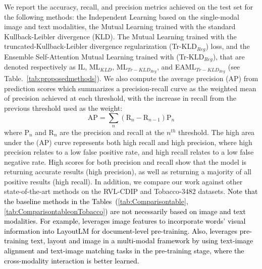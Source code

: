 \documentclass[twocolumn]{svjour3}
\begin{document}
We report the accuracy, recall, and precision metrics achieved on the test set for the following methods: the Independent Learning based on the single-modal image and text modalities, the Mutual Learning trained with the standard Kullback-Leibler divergence (KLD). The Mutual Learning trained with the truncated-Kullback-Leibler divergence regularization (Tr-KLD$_{Reg}$) loss, and the Ensemble Self-Attention Mutual Learning trained with (Tr-KLD$_{Reg}$), that are denoted respectively as IL, ML$_{KLD}$, ML$_{{Tr-KLD}_{Reg}}$, and EAML$_{{Tr-KLD}_{Reg}}$ (see Table.~\ref{tab:proposedmethods}). 
We also compute the average precision (AP) from prediction scores which summarizes a precision-recall curve as the weighted mean of precision achieved at each threshold, with the increase in recall from the previous threshold used as the weight:
\begin{equation}
    \mathrm{AP} = \sum_{n}(\mathrm{R}_{n} - \mathrm{R}_{n-1})\mathrm{P}_{n}
    \label{eq:equation22}
\end{equation}
where $\mathrm{P}_{n}$ and $\mathrm{R}_{n}$ are the precision and recall at the $n^{th}$ threshold. The high area under the (AP) curve represents both high recall and high precision, where high precision relates to a low false positive rate, and high recall relates to a low false negative rate. High scores for both precision and recall show that the model is returning accurate results (high precision), as well as returning a majority of all positive results (high recall). 
In addition, we compare our work against other state-of-the-art methods on the RVL-CDIP and Tobacco-3482 datasets. \textcolor{black}{Note that the baseline methods in the Tables~(\ref{tab:Comparisontable}, \ref{tab:ComparisontableonTobacco}) are not necessarily based on image and text modalities. For example, \cite{Xu2020LayoutLMPO} leverages image features to incorporate words' visual information into LayoutLM for document-level pre-training. Also, \cite{Xu2020LayoutLMv2MP} leverages pre-training text, layout and image in a multi-modal framework by using text-image alignment and text-image matching tasks in the pre-training stage, where the cross-modality interaction is better learned.}
\end{document}
